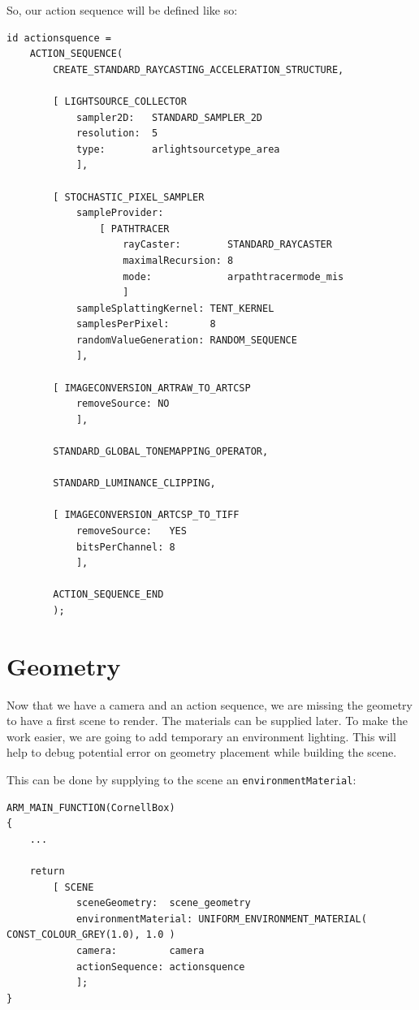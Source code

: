\documentclass[a4paper,chapterprefix]{scrbook}
\begin{document}
So, our action sequence will be defined like so:
\begin{lstlisting}
id actionsquence = 
    ACTION_SEQUENCE(
        CREATE_STANDARD_RAYCASTING_ACCELERATION_STRUCTURE,
            
        [ LIGHTSOURCE_COLLECTOR
            sampler2D:   STANDARD_SAMPLER_2D
            resolution:  5
            type:        arlightsourcetype_area
            ],

        [ STOCHASTIC_PIXEL_SAMPLER
            sampleProvider:
                [ PATHTRACER
                    rayCaster:        STANDARD_RAYCASTER
                    maximalRecursion: 8
                    mode:             arpathtracermode_mis
                    ]
            sampleSplattingKernel: TENT_KERNEL
            samplesPerPixel:       8
            randomValueGeneration: RANDOM_SEQUENCE
            ],

        [ IMAGECONVERSION_ARTRAW_TO_ARTCSP
            removeSource: NO
            ],

        STANDARD_GLOBAL_TONEMAPPING_OPERATOR,
                        
        STANDARD_LUMINANCE_CLIPPING,
            
        [ IMAGECONVERSION_ARTCSP_TO_TIFF
            removeSource:   YES
            bitsPerChannel: 8
            ],
            
        ACTION_SEQUENCE_END
        );
\end{lstlisting}

\section{Geometry}
Now that we have a camera and an action sequence, we are missing the geometry to have a first scene to render. The materials can be supplied later. To make the work easier, we are going to add temporary an environment lighting. This will help to debug potential error on geometry placement while building the scene.

This can be done by supplying to the scene an \verb?environmentMaterial?:

\begin{lstlisting}
ARM_MAIN_FUNCTION(CornellBox)
{
    ...
    
    return
        [ SCENE
            sceneGeometry:  scene_geometry
            environmentMaterial: UNIFORM_ENVIRONMENT_MATERIAL( CONST_COLOUR_GREY(1.0), 1.0 )
            camera:         camera
            actionSequence: actionsquence
            ];
}
\end{lstlisting}
\end{document}
